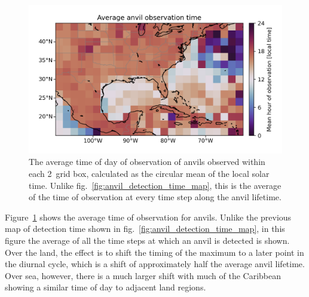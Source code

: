 \begin{figure}[tp]
    \centering
    \includegraphics[width=\textwidth]{figures/chapter2_25.png}
    \caption[
    A map showing the average time of observation of anvils
    ]{
    The average time of day of observation of anvils observed within each 2\textdegree\ grid box, calculated as the circular mean of the local solar time. Unlike fig.~\ref{fig:anvil_detection_time_map}, this is the average of the time of observation at every time step along the anvil lifetime.
    }
    \label{fig:anvil_observation_time_map}
\end{figure}

Figure~\ref{fig:anvil_observation_time_map} shows the average time of observation for anvils.
Unlike the previous map of detection time shown in fig.~\ref{fig:anvil_detection_time_map}, in this figure the average of all the time steps at which an anvil is detected is shown.
Over the land, the effect is to shift the timing of the maximum to a later point in the diurnal cycle, which is a shift of approximately half the average anvil lifetime.
Over sea, however, there is a much larger shift with much of the Caribbean showing a similar time of day to adjacent land regions.

